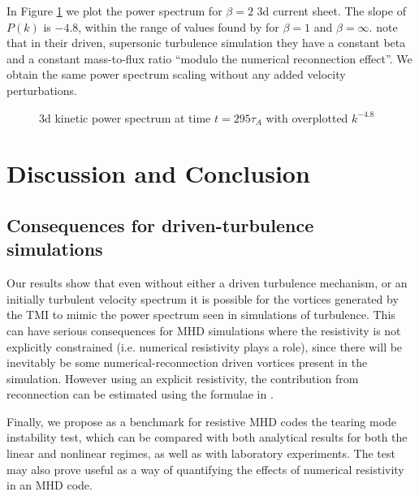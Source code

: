 \documentclass[square]{ws-procs11x85}
\begin{document}
\begin{multicols}{2}
In Figure \ref{fig:psdmagnetic} we plot the power spectrum for $\beta=2$ 3d current sheet. The slope of $P(k)$ is $-4.8$, within the range of values found by \cite{Vestuto} for $\beta=1$ and $\beta=\infty$. \cite{Vestuto} note that in their driven, supersonic turbulence simulation they have a constant beta and a constant mass-to-flux ratio ``modulo the numerical reconnection effect''. We obtain the same power spectrum scaling without any added velocity perturbations.

\begin{figure}[H]
\centerline{}
\caption{\label{fig:psdmagnetic}
3d kinetic power spectrum at time $t=295\tau_A$ with overplotted $k^{-4.8}$
 }
\end{figure}

\section{Discussion and Conclusion}
\label{Discussion}



\subsection{Consequences for driven-turbulence simulations}

Our results show that even without either a driven turbulence mechanism, or an
initially turbulent velocity spectrum it is possible for the vortices generated
by the TMI to mimic the power spectrum seen in simulations of turbulence. This
can have serious consequences for MHD simulations where the resistivity is not
explicitly constrained (i.e. numerical resistivity plays a role), since there 
will be inevitably be some numerical-reconnection driven vortices present in the simulation. However using an explicit resistivity, the contribution from 
reconnection can be estimated using the formulae in \cite{Furth,Rutherford}.

Finally, we propose as a benchmark for resistive MHD codes the tearing mode instability test,
which can be compared with both analytical results for both the linear and
nonlinear regimes, as well as with laboratory experiments. The test may also
prove useful as a way of quantifying the effects of numerical resistivity in an MHD code.
 

\end{multicols}
\end{document}
